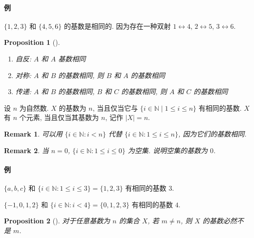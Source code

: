 \documentclass[UTF8]{ctexart}
\theoremstyle{mystyle}
\newtheorem{proposition}{Proposition}[section]
\theoremstyle{myremark}
\newtheorem*{remark}{Remark}
\theoremstyle{plain}
\newcommand{\N}{\mathbb N}
\newcommand{\set}[1]{\{#1\}}
\begin{document}
\paragraph{例}
$ \set{1, 2, 3} $ 和 $ \set{4, 5, 6} $ 的基数是相同的. 因为存在一种双射 $ 1 \leftrightarrow 4 $, $ 2 \leftrightarrow 5 $, $ 3 \leftrightarrow 6 $.

\begin{proposition}[]
    \ 
    \begin{enumerate}
        \item 自反: $ A $ 和 $ A $ 基数相同
        \item 对称: $ A $ 和 $ B $ 的基数相同, 则 $ B $ 和 $ A $ 的基数相同
        \item 传递: $ A $ 和 $ B $ 的基数相同, $ B $ 和 $ C $ 的基数相同, 则 $ A $ 和 $ C $ 的基数相同
    \end{enumerate}
\end{proposition}

\begin{definition}[\text{基数}]
    设 $ n $ 为自然数. $ X $ 的基数为 $ n $, 当且仅当它与 $ \set{i \in \N \mid 1 \leqslant i \leqslant n} $ 有相同的基数. $ X $ 有 $ n $ 个元素, 当且仅当其基数为 $ n $, 记作 $ |X| = n $.
\end{definition}

\begin{remark}
    可以用 $ \set{i \in \N \colon i < n} $ 代替 $ \set{i \in \N \colon 1 \leqslant i \leqslant n} $, 因为它们的基数相同.
\end{remark}

\begin{remark}
    当 $ n = 0 $, $ \set{i \in \N \colon 1 \leqslant i \leqslant 0} $ 为空集. 说明空集的基数为 $ 0 $.
\end{remark}

\paragraph{例}
$ \set{a, b, c} $ 和 $ \set{i \in \N \colon 1 \leqslant i \leqslant 3} = \set{1, 2, 3} $ 有相同的基数 $ 3 $.

$ \set{-1, 0, 1, 2} $ 和 $ \set{i \in \N \colon i < 4} = \set{0, 1, 2, 3} $ 有相同的基数 $ 4 $.

\begin{proposition}[]
    对于任意基数为 $ n $ 的集合 $ X $, 若 $ m \neq n $, 则 $ X $ 的基数必然不是 $ m $.
\end{proposition}
\end{document}
